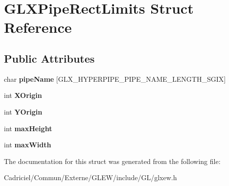 \hypertarget{struct_g_l_x_pipe_rect_limits}{}\section{G\+L\+X\+Pipe\+Rect\+Limits Struct Reference}
\label{struct_g_l_x_pipe_rect_limits}
\subsection*{Public Attributes}
\begin{DoxyCompactItemize}
\item 
char {\bfseries pipe\+Name} \mbox{[}G\+L\+X\+\_\+\+H\+Y\+P\+E\+R\+P\+I\+P\+E\+\_\+\+P\+I\+P\+E\+\_\+\+N\+A\+M\+E\+\_\+\+L\+E\+N\+G\+T\+H\+\_\+\+S\+G\+IX\mbox{]}\hypertarget{struct_g_l_x_pipe_rect_limits_ae78b4b6656101bc841946733a5b6e5ce}{}\label{struct_g_l_x_pipe_rect_limits_ae78b4b6656101bc841946733a5b6e5ce}

\item 
int {\bfseries X\+Origin}\hypertarget{struct_g_l_x_pipe_rect_limits_a3e5a965059d9f5d2ca42acd35af5bb9b}{}\label{struct_g_l_x_pipe_rect_limits_a3e5a965059d9f5d2ca42acd35af5bb9b}

\item 
int {\bfseries Y\+Origin}\hypertarget{struct_g_l_x_pipe_rect_limits_a50e06bcf0dae95854be7d93a515199e9}{}\label{struct_g_l_x_pipe_rect_limits_a50e06bcf0dae95854be7d93a515199e9}

\item 
int {\bfseries max\+Height}\hypertarget{struct_g_l_x_pipe_rect_limits_a27572e499c0d3280031c2ad8e387c0c1}{}\label{struct_g_l_x_pipe_rect_limits_a27572e499c0d3280031c2ad8e387c0c1}

\item 
int {\bfseries max\+Width}\hypertarget{struct_g_l_x_pipe_rect_limits_a8662c7a712b30620e25fc994adf337a1}{}\label{struct_g_l_x_pipe_rect_limits_a8662c7a712b30620e25fc994adf337a1}

\end{DoxyCompactItemize}


The documentation for this struct was generated from the following file\+:\begin{DoxyCompactItemize}
\item 
Cadriciel/\+Commun/\+Externe/\+G\+L\+E\+W/include/\+G\+L/glxew.\+h\end{DoxyCompactItemize}
